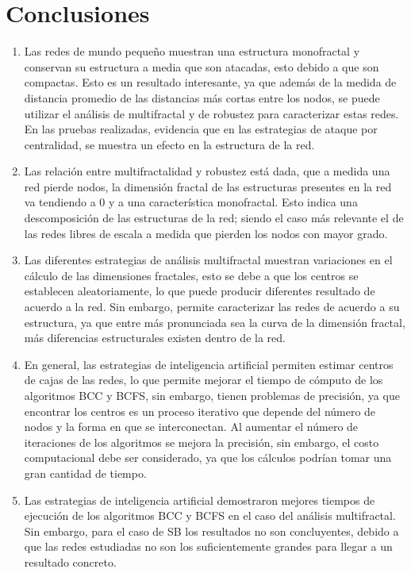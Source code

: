 \section{Conclusiones}

\begin{enumerate}
    \item Las redes de mundo pequeño muestran una estructura monofractal y conservan su estructura a media que son atacadas, esto debido a que son compactas. Esto es un resultado interesante, ya que además de la medida de distancia promedio de las distancias más cortas entre los nodos, se puede utilizar el análisis de multifractal y de robustez para caracterizar estas redes. En las pruebas realizadas, evidencia que en las estrategias de ataque por centralidad, se muestra un efecto en la estructura de la red.
    \item Las relación entre multifractalidad y robustez está dada, que a medida una red pierde nodos, la dimensión fractal de las estructuras presentes en la red va tendiendo a 0 y a una característica monofractal. Esto indica una descomposición de las estructuras de la red; siendo el caso más relevante el de las redes libres de escala a medida que pierden los nodos con mayor grado.
    \item Las diferentes estrategias de análisis multifractal muestran variaciones en el cálculo de las dimensiones fractales, esto se debe a que los centros se establecen aleatoriamente, lo que puede producir diferentes resultado de acuerdo a la red. Sin embargo, permite caracterizar las redes de acuerdo a su estructura, ya que entre más pronunciada sea la curva de la dimensión fractal, más diferencias estructurales existen dentro de la red.
    \item En general, las estrategias de inteligencia artificial permiten estimar centros de cajas de las redes, lo que permite mejorar el tiempo de cómputo de los algoritmos BCC y BCFS, sin embargo, tienen problemas de precisión, ya que encontrar los centros es un proceso iterativo que depende del número de nodos y la forma en que se interconectan. Al aumentar el número de iteraciones de los algoritmos se mejora la precisión, sin embargo, el costo computacional debe ser considerado, ya que los cálculos podrían tomar una gran cantidad de tiempo.
    \item Las estrategias de inteligencia artificial demostraron mejores tiempos de ejecución de los algoritmos BCC y BCFS en el caso del análisis multifractal. Sin embargo, para el caso de SB los resultados no son concluyentes, debido a que las redes estudiadas no son los suficientemente grandes para llegar a un resultado concreto.

\end{enumerate}
